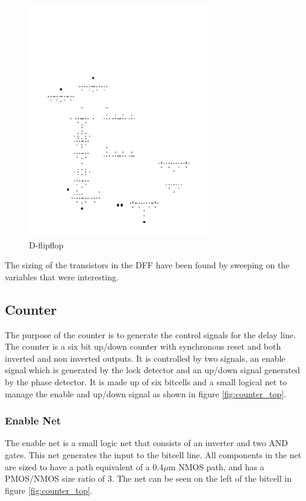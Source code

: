 \documentclass[a4paper,12pt]{article} \usepackage{graphicx}
\begin{document}
\begin{figure}[h]
\centering
\includegraphics[width=0.7\textwidth, angle = 270]{../Bilder/DFF-1.png}
\caption{D-flipflop}
\label{fig:DFF}
\end{figure}

The sizing of the transistors in the DFF have been found by sweeping on the variables that were interesting.

\subsection{Counter}
The purpose of the counter is to generate the control signals for the delay line.
The counter is a six bit up/down counter with synchronous reset and both
inverted and non inverted outputs. It is controlled by two signals, an enable
signal which is generated by the lock detector and an up/down signal generated
by the phase detector. It is made up of six bitcells and a small logical net to
manage the enable and up/down signal as shown in figure \ref{fig:counter_top}.



\subsubsection{Enable Net}
The enable net is a small logic net that consists of an inverter and two
AND gates. This net generates the input to the bitcell line.
All components in the net are sized to have a path equivalent of a 0.4$\mu$m NMOS
path, and has a PMOS/NMOS size ratio of 3. The net can be seen on the left of the
bitcell in figure \ref{fig:counter_top}.
\end{document}
